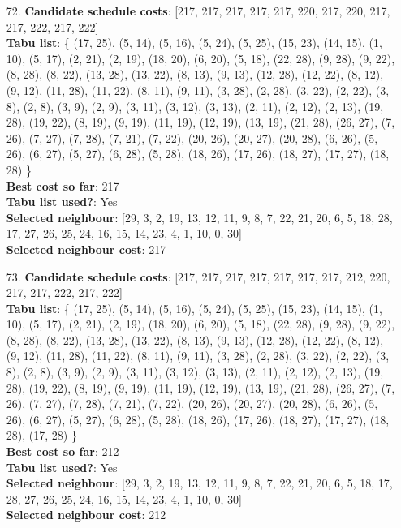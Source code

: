 \documentclass[fleqn]{article}
\begin{document}
\begin{itemize}
    \item[72.] \textbf{Candidate schedule costs}: [217, 217, 217, 217, 217, 220, 217, 220, 217, 217, 222, 217, 222] \\
    \textbf{Tabu list}: \{ (17, 25), (5, 14), (5, 16), (5, 24), (5, 25), (15, 23), (14, 15), (1, 10), (5, 17), (2, 21), (2, 19), (18, 20), (6, 20), (5, 18), (22, 28), (9, 28), (9, 22), (8, 28), (8, 22), (13, 28), (13, 22), (8, 13), (9, 13), (12, 28), (12, 22), (8, 12), (9, 12), (11, 28), (11, 22), (8, 11), (9, 11), (3, 28), (2, 28), (3, 22), (2, 22), (3, 8), (2, 8), (3, 9), (2, 9), (3, 11), (3, 12), (3, 13), (2, 11), (2, 12), (2, 13), (19, 28), (19, 22), (8, 19), (9, 19), (11, 19), (12, 19), (13, 19), (21, 28), (26, 27), (7, 26), (7, 27), (7, 28), (7, 21), (7, 22), (20, 26), (20, 27), (20, 28), (6, 26), (5, 26), (6, 27), (5, 27), (6, 28), (5, 28), (18, 26), (17, 26), (18, 27), (17, 27), (18, 28) \} \\
    \textbf{Best cost so far}: 217 \\
    \textbf{Tabu list used?}: Yes \\
    \textbf{Selected neighbour}: [29, 3, 2, 19, 13, 12, 11, 9, 8, 7, 22, 21, 20, 6, 5, 18, 28, 17, 27, 26, 25, 24, 16, 15, 14, 23, 4, 1, 10, 0, 30] \\
    \textbf{Selected neighbour cost}: 217
      

    \item[73.] \textbf{Candidate schedule costs}: [217, 217, 217, 217, 217, 217, 217, 212, 220, 217, 217, 222, 217, 222] \\
    \textbf{Tabu list}: \{ (17, 25), (5, 14), (5, 16), (5, 24), (5, 25), (15, 23), (14, 15), (1, 10), (5, 17), (2, 21), (2, 19), (18, 20), (6, 20), (5, 18), (22, 28), (9, 28), (9, 22), (8, 28), (8, 22), (13, 28), (13, 22), (8, 13), (9, 13), (12, 28), (12, 22), (8, 12), (9, 12), (11, 28), (11, 22), (8, 11), (9, 11), (3, 28), (2, 28), (3, 22), (2, 22), (3, 8), (2, 8), (3, 9), (2, 9), (3, 11), (3, 12), (3, 13), (2, 11), (2, 12), (2, 13), (19, 28), (19, 22), (8, 19), (9, 19), (11, 19), (12, 19), (13, 19), (21, 28), (26, 27), (7, 26), (7, 27), (7, 28), (7, 21), (7, 22), (20, 26), (20, 27), (20, 28), (6, 26), (5, 26), (6, 27), (5, 27), (6, 28), (5, 28), (18, 26), (17, 26), (18, 27), (17, 27), (18, 28), (17, 28) \} \\
    \textbf{Best cost so far}: 212 \\
    \textbf{Tabu list used?}: Yes \\
    \textbf{Selected neighbour}: [29, 3, 2, 19, 13, 12, 11, 9, 8, 7, 22, 21, 20, 6, 5, 18, 17, 28, 27, 26, 25, 24, 16, 15, 14, 23, 4, 1, 10, 0, 30] \\
    \textbf{Selected neighbour cost}: 212
      


\end{itemize}
\end{document}
